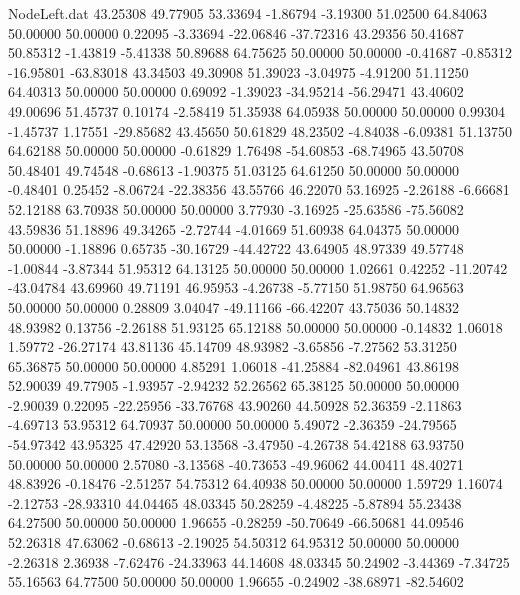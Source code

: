 \begin{filecontents}{NodeLeft.dat}
  43.25308   49.77905   53.33694    -1.86794   -3.19300   51.02500   64.84063   50.00000   50.00000    0.22095   -3.33694  -22.06846  -37.72316
  43.29356   50.41687   50.85312    -1.43819   -5.41338   50.89688   64.75625   50.00000   50.00000   -0.41687   -0.85312  -16.95801  -63.83018
  43.34503   49.30908   51.39023    -3.04975   -4.91200   51.11250   64.40313   50.00000   50.00000    0.69092   -1.39023  -34.95214  -56.29471
  43.40602   49.00696   51.45737     0.10174   -2.58419   51.35938   64.05938   50.00000   50.00000    0.99304   -1.45737    1.17551  -29.85682
  43.45650   50.61829   48.23502    -4.84038   -6.09381   51.13750   64.62188   50.00000   50.00000   -0.61829    1.76498  -54.60853  -68.74965
  43.50708   50.48401   49.74548    -0.68613   -1.90375   51.03125   64.61250   50.00000   50.00000   -0.48401    0.25452   -8.06724  -22.38356
  43.55766   46.22070   53.16925    -2.26188   -6.66681   52.12188   63.70938   50.00000   50.00000    3.77930   -3.16925  -25.63586  -75.56082
  43.59836   51.18896   49.34265    -2.72744   -4.01669   51.60938   64.04375   50.00000   50.00000   -1.18896    0.65735  -30.16729  -44.42722
  43.64905   48.97339   49.57748    -1.00844   -3.87344   51.95312   64.13125   50.00000   50.00000    1.02661    0.42252  -11.20742  -43.04784
  43.69960   49.71191   46.95953    -4.26738   -5.77150   51.98750   64.96563   50.00000   50.00000    0.28809    3.04047  -49.11166  -66.42207
  43.75036   50.14832   48.93982     0.13756   -2.26188   51.93125   65.12188   50.00000   50.00000   -0.14832    1.06018    1.59772  -26.27174
  43.81136   45.14709   48.93982    -3.65856   -7.27562   53.31250   65.36875   50.00000   50.00000    4.85291    1.06018  -41.25884  -82.04961
  43.86198   52.90039   49.77905    -1.93957   -2.94232   52.26562   65.38125   50.00000   50.00000   -2.90039    0.22095  -22.25956  -33.76768
  43.90260   44.50928   52.36359    -2.11863   -4.69713   53.95312   64.70937   50.00000   50.00000    5.49072   -2.36359  -24.79565  -54.97342
  43.95325   47.42920   53.13568    -3.47950   -4.26738   54.42188   63.93750   50.00000   50.00000    2.57080   -3.13568  -40.73653  -49.96062
  44.00411   48.40271   48.83926    -0.18476   -2.51257   54.75312   64.40938   50.00000   50.00000    1.59729    1.16074   -2.12753  -28.93310
  44.04465   48.03345   50.28259    -4.48225   -5.87894   55.23438   64.27500   50.00000   50.00000    1.96655   -0.28259  -50.70649  -66.50681
  44.09546   52.26318   47.63062    -0.68613   -2.19025   54.50312   64.95312   50.00000   50.00000   -2.26318    2.36938   -7.62476  -24.33963
  44.14608   48.03345   50.24902    -3.44369   -7.34725   55.16563   64.77500   50.00000   50.00000    1.96655   -0.24902  -38.68971  -82.54602

\end{filecontents}
